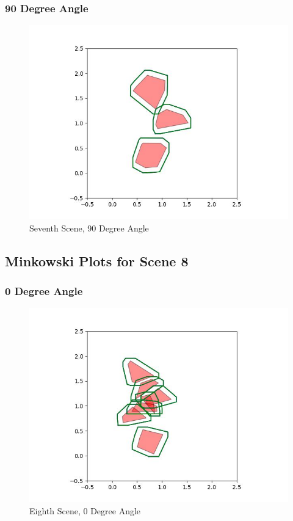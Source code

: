 \documentclass{article}
\begin{document}
\newpage
\subsubsection{90 Degree Angle}
\begin{figure}[h!]
	\includegraphics[width= 0.9 \linewidth]{Problem3_minkowski7_90.jpg}
	\centering
	\caption{Seventh Scene, 90 Degree Angle}
	\label{Problem3_minkowski7_90.jpg}
\end{figure}

\newpage
\subsection{Minkowski Plots for Scene 8}
\subsubsection{0 Degree Angle}
\begin{figure}[h!]
	\includegraphics[width= 0.9 \linewidth]{Problem3_minkowski8_0.jpg}
	\centering
	\caption{Eighth Scene, 0 Degree Angle}
	\label{Problem3_minkowski8_0.jpg}
\end{figure}
\end{document}
